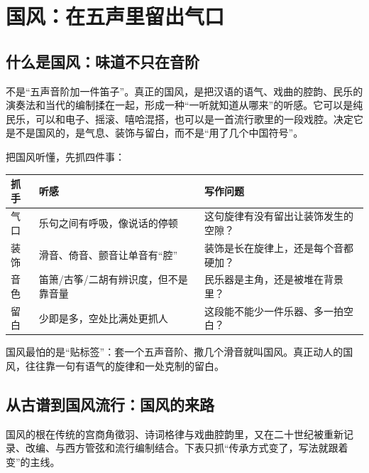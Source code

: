 \chapter{国风：在五声里留出气口}
\label{ch:genre-guofeng-deep}


\section{什么是国风：味道不只在音阶}
\label{sec:guofeng-what}

不是“五声音阶加一件笛子”。真正的国风，是把汉语的语气、戏曲的腔韵、民乐的演奏法和当代的编制揉在一起，形成一种“一听就知道从哪来”的听感。它可以是纯民乐，可以和电子、摇滚、嘻哈混搭，也可以是一首流行歌里的一段戏腔。决定它是不是国风的，是气息、装饰与留白，而不是“用了几个中国符号”。

把国风听懂，先抓四件事：

\begin{longtable}{p{}p{}p{}}
\toprule
抓手 & 听感 & 写作问题 \\
\midrule
气口 & 乐句之间有呼吸，像说话的停顿 & 这句旋律有没有留出让装饰发生的空隙？ \\
装饰 & 滑音、倚音、颤音让单音有“腔” & 装饰是长在旋律上，还是每个音都硬加？ \\
音色 & 笛箫/古筝/二胡有辨识度，但不是靠音量 & 民乐器是主角，还是被堆在背景里？ \\
留白 & 少即是多，空处比满处更抓人 & 这段能不能少一件乐器、多一拍空白？ \\
\bottomrule
\end{longtable}

国风最怕的是“贴标签”：套一个五声音阶、撒几个滑音就叫国风。真正动人的国风，往往靠一句有语气的旋律和一处克制的留白。

\section{从古谱到国风流行：国风的来路}
\label{sec:guofeng-history}

国风的根在传统的宫商角徵羽、诗词格律与戏曲腔韵里，又在二十世纪被重新记录、改编、与西方管弦和流行编制结合。下表只抓“传承方式变了，写法就跟着变”的主线。

